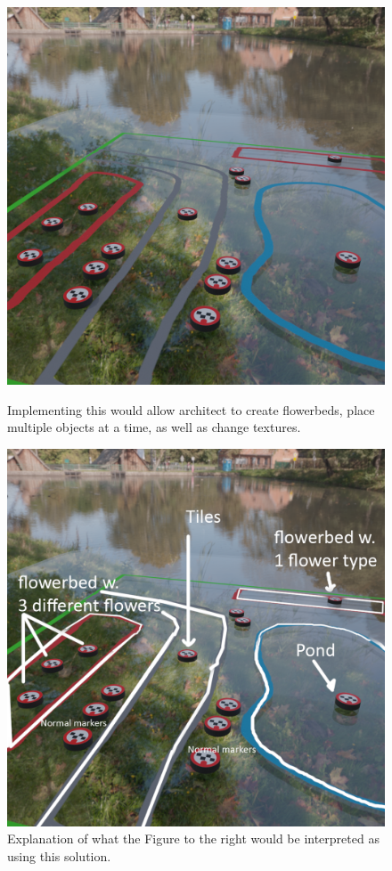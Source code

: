 \begin{figure}[H]
	\centering
	\begin{minipage}[b]{0.49\textwidth}
		\includegraphics[width=1.0\linewidth]{figure/Evaluation/futuremarkers.png}
		\caption{Implementing this would allow architect to create flowerbeds, place multiple objects at a time, as well as change textures.}
		\label{fig:ftemarkers}
	\end{minipage}
	\hfill
	\begin{minipage}[b]{0.49\textwidth}
		\includegraphics[width=1.0\linewidth]{figure/Evaluation/futuremarkerslegend.png}
		\caption{Explanation of what the Figure to the right would be interpreted as using this solution.}
		\label{fig:ftrmarkerslegend}
	\end{minipage}
\end{figure}

